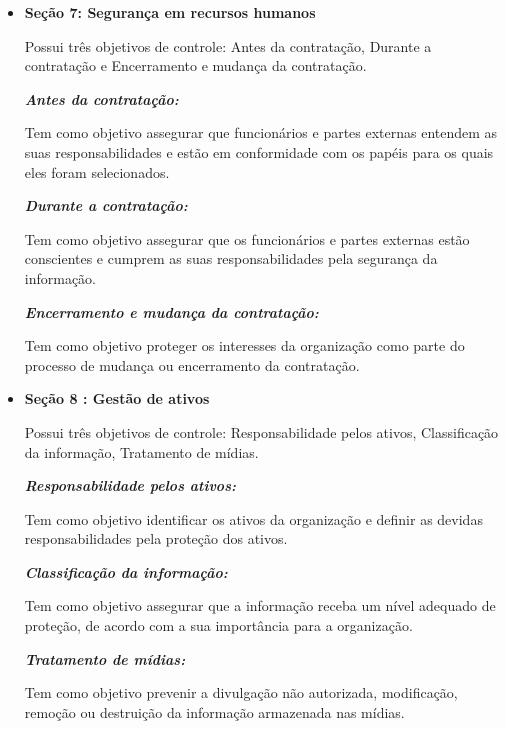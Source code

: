 \begin{itemize}
    \item \textbf{Seção 7: Segurança em recursos humanos}
    
    Possui três objetivos de controle: Antes da contratação, Durante a contratação e Encerramento e mudança da contratação.
    
  \textit{\textbf{Antes da contratação:}}
    
    Tem como objetivo assegurar que funcionários e partes externas entendem as suas responsabilidades e estão em conformidade com os papéis para os quais eles foram selecionados.

  \textit{\textbf{Durante a contratação:}}
    
    Tem como objetivo assegurar que os funcionários e partes externas estão conscientes e cumprem as suas responsabilidades pela segurança da informação.

    \textit{\textbf{Encerramento e mudança da contratação:} }
    
    Tem como objetivo proteger os interesses da organização como parte do processo de mudança ou encerramento da contratação.
\end{itemize}
\begin{itemize}
    \item \textbf{Seção 8 : Gestão de ativos} 
    
    Possui três objetivos de controle: Responsabilidade pelos ativos, Classificação da informação, Tratamento de mídias.
    
    \textit{\textbf{Responsabilidade pelos ativos:} }
    
    Tem como objetivo identificar os ativos da organização e definir as devidas responsabilidades pela proteção dos ativos.
    
    \textit{\textbf{Classificação da informação:}}
    
    Tem como objetivo assegurar que a informação receba um nível adequado de proteção, de acordo com a sua importância para a organização.
    
    \textit{\textbf{Tratamento de mídias:} }
    
    Tem como objetivo prevenir a divulgação não autorizada, modificação, remoção ou destruição da informação armazenada nas mídias.

\end{itemize}
